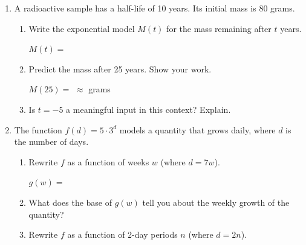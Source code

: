 \documentclass[10pt]{article}
\begin{document}
\begin{enumerate}[itemsep=18pt]
\item A radioactive sample has a half-life of 10 years. Its initial mass is 80 grams.

      \begin{enumerate}[label=(\alph*), itemsep=8pt]
        \item Write the exponential model $M(t)$ for the mass remaining after $t$ years.

              \vspace{0.06in}
              $M(t) = $ \smash{\gradedblank[id=hw3a, type=short, points=1, answer={80 \cdot (0.5)^{t/10}}]{7cm}{13pt}}

        \item Predict the mass after 25 years. Show your work.

              \vspace{0.06in}
              $M(25) = $ \blank{8cm} $\approx$ \smash{\gradedblank[id=hw3b, type=short, check=numeric, tolerance=0.05, points=2, answer={14.1}]{2cm}{13pt}} grams

        \item Is $t = -5$ a meaningful input in this context? Explain.

              \rubricbox[0.06in]{\gradedblank[id=hw3c, type=rubric, points=2,
  display={No: $t$ is the time elapsed since the start; a negative time has no meaning here.}]{\linewidth}{17pt}}
      \end{enumerate}

\item The function $f(d) = 5 \cdot 3^d$ models a quantity that grows daily, where $d$ is the
      number of days.

      \begin{enumerate}[label=(\alph*), itemsep=8pt]
        \item Rewrite $f$ as a function of weeks $w$ (where $d = 7w$).

              \vspace{0.06in}
              $g(w) = $ \smash{\gradedblank[id=hw4a, type=short, points=2, answer={5 \cdot 2187^w}]{8cm}{13pt}}

        \item What does the base of $g(w)$ tell you about the weekly growth of the quantity?

              \rubricbox[0.04in]{\gradedblank[id=hw4b, type=rubric, points=1,
  display={The quantity multiplies by 2187 every week.}]{\linewidth}{15.5pt}}

        \item Rewrite $f$ as a function of 2-day periods $n$ (where $d = 2n$).


\end{enumerate}
\end{enumerate}
\end{document}
